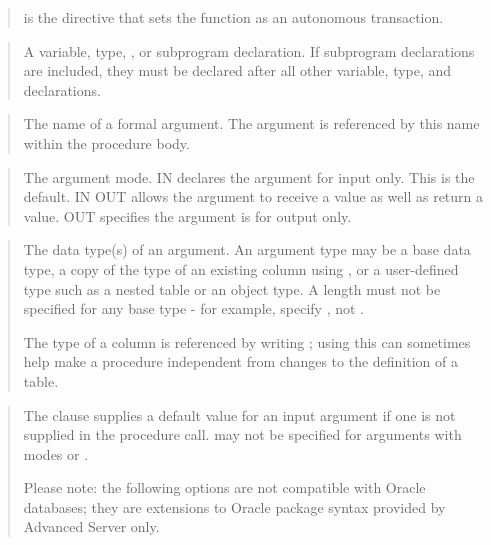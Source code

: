 \documentclass[letterpaper,10pt,english,openany,oneside]{sphinxmanual}
\begin{document}
\begin{quote}

 is the directive that sets the function as an autonomous transaction.
\end{quote}

\begin{quote}

A variable, type, , or subprogram declaration. If subprogram
declarations are included, they must be declared after all other
variable, type, and  declarations.
\end{quote}

\begin{quote}

The name of a formal argument. The argument is referenced by this name
within the procedure body.
\end{quote}

\begin{quote}

The argument mode. IN declares the argument for input only. This is the
default. IN OUT allows the argument to receive a value as well as return
a value. OUT specifies the argument is for output only.
\end{quote}

\newpage

\begin{quote}

The data type(s) of an argument. An argument type may be a base data
type, a copy of the type of an existing column using , or a
user-defined type such as a nested table or an object type. A length
must not be specified for any base type - for example, specify ,
not .

The type of a column is referenced by writing
; using this can sometimes help make a
procedure independent from changes to the definition of a table.
\end{quote}

\begin{quote}

The  clause supplies a default value for an input argument if one
is not supplied in the procedure call.  may not be specified for
arguments with modes  or .

Please note: the following options are not compatible with Oracle
databases; they are extensions to Oracle package syntax provided by
Advanced Server only.
\end{quote}
\end{document}
